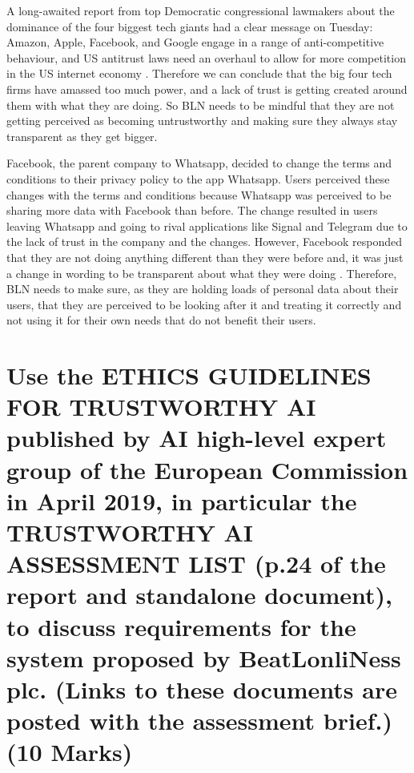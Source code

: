 \documentclass[a4paper,10pt]{article}
\begin{document}
	A long-awaited report from top Democratic congressional lawmakers about the dominance of the four biggest tech giants had a clear message on Tuesday: Amazon, Apple, Facebook, and Google engage in a range of anti-competitive behaviour, and US antitrust laws need an overhaul to allow for more competition in the US internet economy \cite{recorde_big_tech}. Therefore we can conclude that the big four tech firms have amassed too much power, and a lack of trust is getting created around them with what they are doing. So BLN needs to be mindful that they are not getting perceived as becoming untrustworthy and making sure they always stay transparent as they get bigger. 

	Facebook, the parent company to Whatsapp, decided to change the terms and conditions to their privacy policy to the app Whatsapp. Users perceived these changes with the terms and conditions because Whatsapp was perceived to be sharing more data with Facebook than before. The change resulted in users leaving Whatsapp and going to rival applications like Signal and Telegram due to the lack of trust in the company and the changes. However, Facebook responded that they are not doing anything different than they were before and, it was just a change in wording to be transparent about what they were doing  \cite{whatsapp_fb_data}. Therefore, BLN needs to make sure, as they are holding loads of personal data about their users, that they are perceived to be looking after it and treating it correctly and not using it for their own needs that do not benefit their users.

	
\section{Use the ETHICS GUIDELINES FOR TRUSTWORTHY AI published by AI high-level expert group of the European Commission in April 2019, in particular the TRUSTWORTHY AI ASSESSMENT LIST (p.24 of the report and standalone document), to discuss requirements for the system proposed by BeatLonliNess plc. (Links to these documents are posted with the assessment brief.) (10 Marks)}
\end{document}
